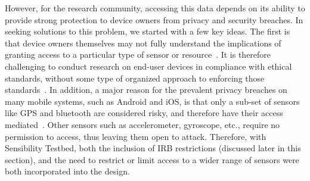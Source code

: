 
However, for the research community, accessing this data depends on its 
ability to provide strong protection to device owners from privacy and 
security breaches. In seeking solutions to this problem, we started with a 
few key ideas. The first is that device owners themselves may not fully 
understand the implications of granting access to a particular type of 
sensor or resource~\cite{felt2012android}. It is therefore challenging to 
conduct research on end-user devices in compliance with ethical standards, 
without some type of organized approach to enforcing those 
standards~\cite{zevenbergen2013ethical}. In addition, a major reason for 
the prevalent privacy breaches on many mobile systems, such as Android and iOS, 
is that only a sub-set of sensors like GPS and bluetooth are considered risky, 	
and therefore have their access mediated~\cite{android-sec}. Other sensors 
such as accelerometer, gyroscope, etc., require no permission to access, 
thus leaving them open to attack. Therefore, with Sensibility Testbed, 
both the inclusion of IRB restrictions (discussed later in this section), and 
the need to restrict or limit access to a wider range of sensors were both 
incorporated into the design.	

